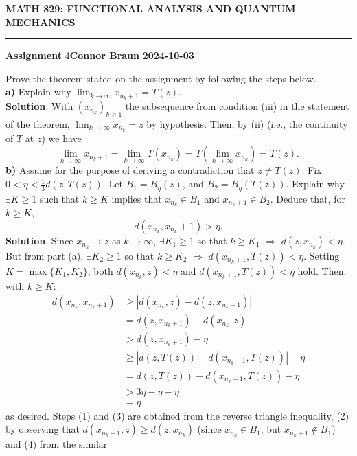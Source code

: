 \documentclass[10pt]{article}
\newcommand{\1}[1]{\mathbbm{1}_{#1}} \newcommand{\mc}[1]{\mathcal{#1}}
\begin{document}
    \begin{center}
        {\bf\large{MATH 829: FUNCTIONAL ANALYSIS AND QUANTUM MECHANICS}}
        \smallskip
        \hrule
        \smallskip
        {\bf Assignment} 4\hfill {\bf Connor Braun} \hfill {\bf 2024-10-03}
    \end{center}
    \vspace{5pt}
     Prove the theorem stated on the
    assignment by following the steps below.\\[5pt]
    {\bf a)} Explain why $\lim_{k\rightarrow \infty} x_{n_k+1}=T(z)$.\\[5pt]
    {\bf Solution}. With $(x_{n_k})_{k\geq 1}$ the subsequence from condition
    (iii) in the statement of the theorem, $\lim_{k\rightarrow\infty}x_{n_k}= z$
    by hypothesis. Then, by (ii) (i.e., the continuity of $T$ at $z$) we have 
    \[\lim_{k\rightarrow\infty}x_{n_k+1}=\lim_{k\rightarrow\infty}T(x_{n_k})=T(\lim_{k\rightarrow\infty}x_{n_k})=T(z).\tag*{$\qed$}\]
    {\bf b)} Assume for the purpose of deriving a contradiction that $z\neq
    T(z)$. Fix $0<\eta<\tfrac{1}{3}d(z,T(z))$. Let $B_1=B_\eta(z)$, and
    $B_2=B_\eta(T(z))$. Explain why $\exists K\geq 1$ such that $k\geq K$
    implies that $x_{n_k}\in B_1$ and $x_{n_k+1}\in B_2$. Deduce that, for
    $k\geq K$, 
    \[d(x_{n_k},x_{n_k}+1)>\eta.\] {\bf Solution}. Since $x_{n_k}\rightarrow z$
    as $k\rightarrow\infty$, $\exists K_1\geq 1$ so that $k\geq K_1$
    $\Rightarrow$ $d(z,x_{n_k})<\eta$. But from part (a), $\exists K_2\geq 1$ so
    that $k\geq K_2$ $\Rightarrow$ $d(x_{n_k+1},T(z))<\eta$. Setting
    $K=\max\{K_1,K_2\}$, both $d(x_{n_k},z)<\eta$ and $d(x_{n_k+1},T(z))<\eta$
    hold. Then, with $k\geq K$:
    \begin{align*}
        d(x_{n_k},x_{n_k+1})&\geq |d(x_{n_k},z)-d(z,x_{n_k+1})|\tag{1}\\
        &=d(z,x_{n_k+1})-d(x_{n_k},z)\tag{2}\\
        &>d(z,x_{n_k+1})-\eta\\
        &\geq|d(z,T(z))-d(x_{n_k+1},T(z))|-\eta\tag{3}\\
        &=d(z,T(z))-d(x_{n_k+1},T(z))-\eta\tag{4}\\
        &>3\eta-\eta-\eta\tag{5}\\
        &=\eta
    \end{align*}
    as desired. Steps (1) and (3) are obtained from the reverse triangle
    inequality, (2) by observing that $d(x_{n_k+1},z)\geq d(z,x_{n_k})$ (since
    $x_{n_k}\in B_1$, but $x_{n_k+1}\notin B_1$) and (4) from the similar
\end{document}
